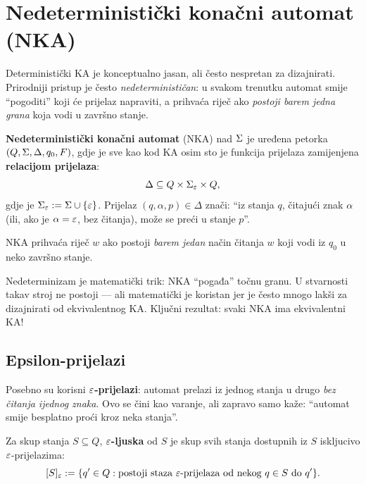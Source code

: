\section{Nedeterministički konačni automat (NKA)}

Deterministički KA je konceptualno jasan, ali često nespretan za
dizajnirati. Prirodniji pristup je često \emph{nedeterminističan}:
u svakom trenutku automat smije ``pogoditi'' koji će prijelaz napraviti,
a prihvaća riječ ako \emph{postoji barem jedna grana} koja vodi u
završno stanje.

\begin{definicija}[Nedeterministički KA]
\textbf{Nedeterministički konačni automat} (NKA) nad $\Sigma$ je
uređena petorka $(Q, \Sigma, \Delta, q_0, F)$, gdje je sve kao kod KA
osim sto je funkcija prijelaza zamijenjena \textbf{relacijom prijelaza}:
\[
  \Delta \subseteq Q \times \Sigma_\varepsilon \times Q,
\]
gdje je $\Sigma_\varepsilon := \Sigma \cup \{\varepsilon\}$. Prijelaz $(q, \alpha, p) \in \Delta$
znači: ``iz stanja $q$, čitajući znak $\alpha$ (ili, ako je $\alpha = \varepsilon$,
bez čitanja), može se preći u stanje $p$''.

NKA prihvaća riječ $w$ ako postoji \emph{barem jedan} način čitanja
$w$ koji vodi iz $q_0$ u neko završno stanje.
\end{definicija}

\begin{kljucno}
Nedeterminizam je matematički trik: NKA ``pogađa'' točnu granu.
U stvarnosti takav stroj ne postoji --- ali matematički je koristan
jer je često mnogo lakši za dizajnirati od ekvivalentnog KA.
Ključni rezultat: svaki NKA ima ekvivalentni KA!
\end{kljucno}

\subsection{Epsilon-prijelazi}

Posebno su korisni \textbf{$\varepsilon$-prijelazi}: automat prelazi iz jednog
stanja u drugo \emph{bez čitanja ijednog znaka}. Ovo se čini kao
varanje, ali zapravo samo kaže: ``automat smije besplatno proći kroz
neka stanja''.

\begin{definicija}
Za skup stanja $S \subseteq Q$, \textbf{$\varepsilon$-ljuska} od $S$ je skup
svih stanja dostupnih iz $S$ iskljucivo $\varepsilon$-prijelazima:
\[
  [S]_\varepsilon := \{q' \in Q : \text{postoji staza } \varepsilon\text{-prijelaza od nekog } q \in S \text{ do } q'\}.
\]
\end{definicija}

